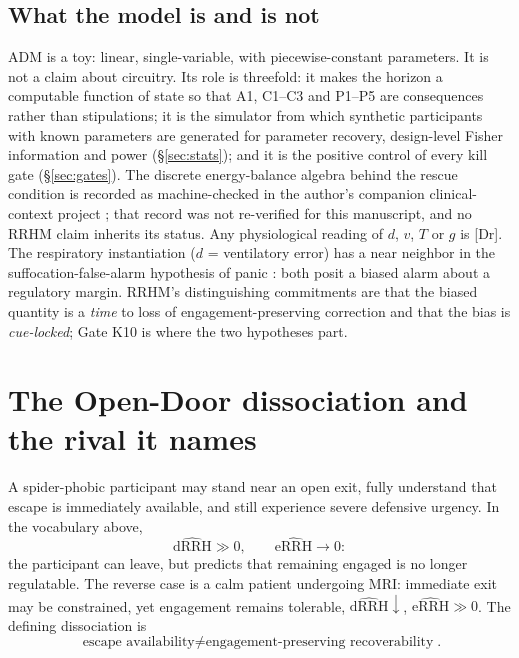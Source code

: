 \documentclass[9pt,twocolumn]{article}
\newcommand{\eRRHhat}{\widehat{\mathrm{eRRH}}}
\newcommand{\dRRHhat}{\widehat{\mathrm{dRRH}}}
\newcommand{\tier}[1]{{\sffamily\scriptsize\color{RRHMSlate}[#1]}}
\begin{document}
\subsection{What the model is and is not}
ADM is a toy: linear, single-variable, with piecewise-constant parameters. It is not a claim about circuitry. Its role is threefold: it makes the horizon a computable function of state so that A1, C1--C3 and P1--P5 are consequences rather than stipulations; it is the simulator from which synthetic participants with known parameters are generated for parameter recovery, design-level Fisher information and power (\S\ref{sec:stats}); and it is the positive control of every kill gate (\S\ref{sec:gates}). The discrete energy-balance algebra behind the rescue condition is recorded as machine-checked in the author's companion clinical-context project \cite{lahtee2026birca}; that record was not re-verified for this manuscript, and no RRHM claim inherits its status. Any physiological reading of $d$, $v$, $T$ or $g$ is \tier{Dr}. The respiratory instantiation ($d$ = ventilatory error) has a near neighbor in the suffocation-false-alarm hypothesis of panic \cite{klein1993}: both posit a biased alarm about a regulatory margin. RRHM's distinguishing commitments are that the biased quantity is a \emph{time} to loss of engagement-preserving correction and that the bias is \emph{cue-locked}; Gate K10 is where the two hypotheses part.

\section{The Open-Door dissociation and the rival it names}
\label{sec:opendoor}
A spider-phobic participant may stand near an open exit, fully understand that escape is immediately available, and still experience severe defensive urgency. In the vocabulary above,
\[
\dRRHhat\gg0,\qquad \eRRHhat\rightarrow0:
\]
the participant can leave, but predicts that remaining engaged is no longer regulatable. The reverse case is a calm patient undergoing MRI: immediate exit may be constrained, yet engagement remains tolerable, $\dRRHhat\downarrow$, $\eRRHhat\gg0$. The defining dissociation is
\[
\boxed{\text{escape availability}\neq\text{engagement-preserving recoverability}}.
\]
\end{document}
